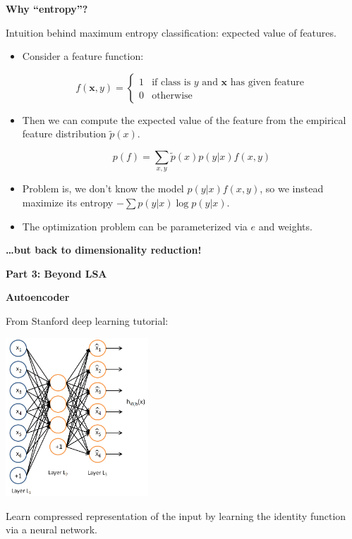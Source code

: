 \documentclass{beamer}
\newcommand{\placard}[1]{
  \begin{frame}
    \begin{center}
      \huge
      \textbf{#1}
    \end{center}
  \end{frame}
}
\newcommand{\pagestepalt}[2]{
  \begin{frame}[t]
    \begin{minipage}[t][0.26\textheight][t]{\textwidth}
      \begin{center}
        \huge
        \textbf{#1}
      \end{center}
    \end{minipage}
    
    \begin{minipage}[t][0.7\textheight][c]{\textwidth}
      #2
    \end{minipage}
  \end{frame}
}
\begin{document}
\pagestepalt{Why ``entropy''?}{
  \vspace{-1.5cm}
  Intuition behind maximum entropy classification: expected value of features.
  \vspace{-0.6cm}
  \begin{itemize}
  \item Consider a feature function:
    \begin{block}{}
      \[
      f(\mathbf{x}, y) =
      \begin{cases}
        1 & \text{if class is } y \text{ and } \mathbf{x} \text{ has given feature}  \\
        0 & \text{otherwise}
      \end{cases}
      \]
    \end{block}\pause
  \item Then we can compute the expected value of the feature from the empirical feature distribution $\tilde{p}(x)$.
    \begin{block}{}
      \[p(f) = \sum_{x,y} \tilde{p}(x)p(y|x)f(x,y)\]
    \end{block}\pause
  \item Problem is, we don't know the model $p(y|x)f(x,y)$, so we
    instead maximize its entropy $-\sum p(y|x) \log p(y|x)$.\pause
  \item The optimization problem can be parameterized via $e$ and weights.
  \end{itemize}
}

\placard{\ldots but back to dimensionality reduction!}

\placard{Part 3: Beyond LSA}

\pagestepalt{Autoencoder}{
  \vspace{-0.6cm}
  From Stanford deep learning tutorial:
  \begin{center}
    \includegraphics[width=0.4\textwidth]{autoencoder.png}
  \end{center}
  Learn compressed representation of the input by learning the
  identity function via a neural network.
}
\end{document}
